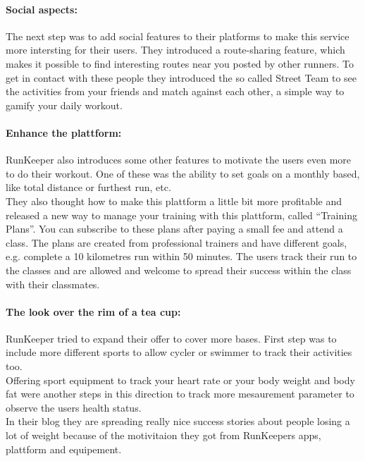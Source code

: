 \documentclass[a4paper,11pt]{article}
\begin{document}
\paragraph{Social aspects:} The next step was to add social features to their platforms to make this service more intersting for their users. They introduced a route-sharing feature, which makes it possible to find interesting routes near you posted by other runners. To get in contact with these people they introduced the so called Street Team to see the activities from your friends and match against each other, a simple way to gamify your daily workout.

\paragraph{Enhance the plattform:} RunKeeper also introduces some other features to motivate the users even more to do their workout. One of these was the ability to set goals on a monthly based, like total distance or furthest run, etc. \\

They also thought how to make this plattform a little bit more profitable and released a new way to manage your training with this plattform, called ``Training Plans''. You can subscribe to these plans after paying a small fee and attend a class. The plans are created from professional trainers and have different goals, e.g. complete a 10 kilometres run within 50 minutes. The users track their run to the classes and are allowed and welcome to spread their success within the class with their classmates.

\paragraph{The look over the rim of a tea cup:} RunKeeper tried to expand their offer to cover more bases. First step was to include more different sports to allow cycler or swimmer to track their activities too. \\

Offering sport equipment to track your heart rate or your body weight and body fat were another steps in this direction to track more mesaurement parameter to observe the users health status. \\

In their blog they are spreading really nice success stories about people losing a lot of weight because of the motivitaion they got from RunKeepers apps, plattform and equipement. \\
\end{document}
